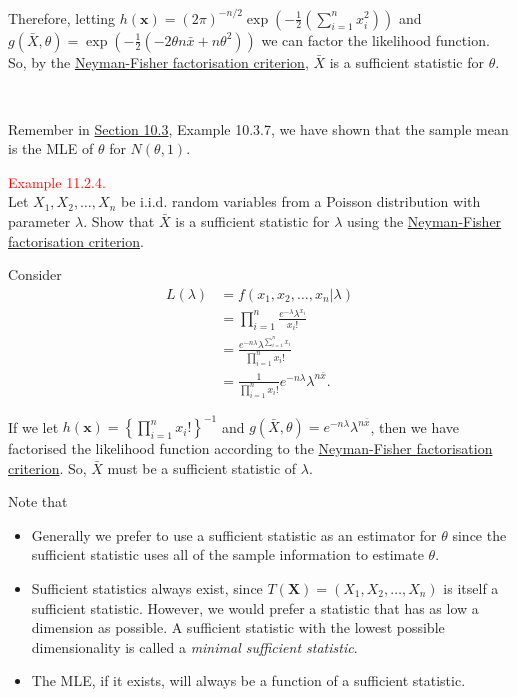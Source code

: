 \documentclass[
]{book}
\providecommand{\tightlist}{%
  \setlength{\itemsep}{0pt}\setlength{\parskip}{0pt}}
\begin{document}
Therefore, letting \(h(\mathbf{x}) = (2 \pi)^{-n/2} \exp \left(-\frac{1}{2} \left( \sum_{i=1}^n x_i^2 \right) \right)\) and \(g(\bar{X},\theta) = \exp \left(-\frac{1}{2} \left( -2 \theta n \bar{x} + n \theta^2 \right) \right)\) we can factor the likelihood function. So, by the \protect\hyperlink{MLEprop:thm:Neyman-Fisher}{Neyman-Fisher factorisation criterion}, \(\bar{X}\) is a sufficient statistic for \(\theta\).

~

Remember in \protect\hyperlink{MLE:MLE}{Section 10.3}, Example 10.3.7, we have shown that the sample mean is the MLE of \(\theta\) for \(N(\theta,1)\).

\leavevmode{}%
\textcolor{red}{Example 11.2.4.}\\
Let \(X_1,X_2,\dots,X_n\) be i.i.d. random variables from a Poisson distribution with parameter \(\lambda\). Show that \(\bar{X}\) is a sufficient statistic for \(\lambda\) using the \protect\hyperlink{MLEprop:thm:Neyman-Fisher}{Neyman-Fisher factorisation criterion}.

Consider\\

\begin{align*}  
L(\lambda) &= f(x_1,x_2,\dots,x_n|\lambda) \\
&= \prod\limits_{i=1}^n \frac{ e^{-\lambda}\lambda^{x_i} }{x_i!} \\
&= \frac{ e^{-n\lambda} \lambda^{\sum\limits_{i=1}^n x_i} }{ \prod\limits_{i=1}^n x_i!} \\
&= \frac{1}{\prod\limits_{i=1}^n x_i !} e^{-n\lambda} \lambda^{n \bar{x}}.
\end{align*}

If we let \(h(\mathbf{x}) = \left\{\prod\limits_{i=1}^n x_i ! \right\}^{-1}\) and \(g(\bar{X},\theta) = e^{-n\lambda} \lambda^{n \bar{x}}\), then we have factorised the likelihood function according to the \protect\hyperlink{MLEprop:thm:Neyman-Fisher}{Neyman-Fisher factorisation criterion}. So, \(\bar{X}\) must be a sufficient statistic of \(\lambda\).

\hfill\break

Note that

\begin{itemize}
\tightlist
\item
  Generally we prefer to use a sufficient statistic as an estimator for \(\theta\) since the sufficient statistic uses all of the sample information to estimate \(\theta\).\\
\item
  Sufficient statistics always exist, since \(T(\mathbf{X}) = (X_1,X_2,\dots,X_n)\) is itself a sufficient statistic. However, we would prefer a statistic that has as low a dimension as possible. A sufficient statistic with the lowest possible dimensionality is called a \emph{minimal sufficient statistic}.\\
\item
  The MLE, if it exists, will always be a function of a sufficient statistic.
\end{itemize}
\end{document}
